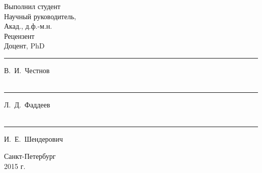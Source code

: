 \begin{titlepage}
\begin{center}
\begin{flushleft}
\begin{minipage}[b]{0.5\textwidth}
\begin{flushleft}
	Выполнил студент\\[1cm]
	Научный руководитель,\\
	Акад., д.ф.-м.н.\\[1cm]
	Рецензент\\
	Доцент, PhD
\end{flushleft}
\end{minipage}
\begin{minipage}[b]{0.45\textwidth}
\begin{flushleft}
\rule{3cm}{0.5pt} В.~И.~Честнов\\[1cm]
\hfill\\
\rule{3cm}{0.5pt} Л.~Д.~Фаддеев\\[1cm]
\hfill\\
\rule{3cm}{0.5pt} И.~Е.~Шендерович
\end{flushleft}
\end{minipage}
\end{flushleft}
\vspace{2cm}

Санкт-Петербург\\
2015 г.

\end{center}
\end{titlepage}